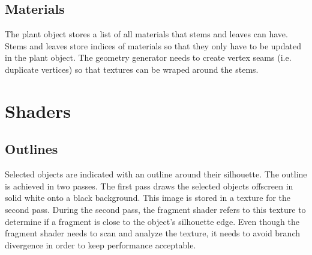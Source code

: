 \documentclass[10pt]{article}
\begin{document}
\subsection{Materials}

The plant object stores a list of all materials that stems and leaves can have. Stems and leaves store indices of materials so that they only have to be updated in the plant object. The geometry generator needs to create vertex seams (i.e. duplicate vertices) so that textures can be wraped around the stems.

\section{Shaders}

\subsection{Outlines}

Selected objects are indicated with an outline around their silhouette. The outline is achieved in two passes. The first pass draws the selected objects offscreen in solid white onto a black background. This image is stored in a texture for the second pass. During the second pass, the fragment shader refers to this texture to determine if a fragment is close to the object's silhouette edge. Even though the fragment shader needs to scan and analyze the texture, it needs to avoid branch divergence in order to keep performance acceptable.
\end{document}
